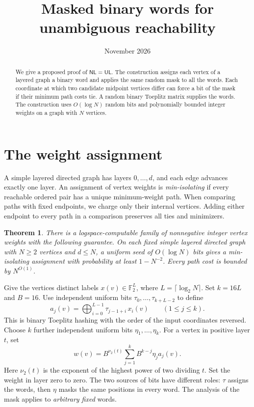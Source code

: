 \documentclass[11pt]{article}
\title{Masked binary words for unambiguous reachability}
\author{}
\date{November 2026}
\newtheorem{theorem}{Theorem}
\newcommand{\NL}{\mathsf{NL}}
\newcommand{\UL}{\mathsf{UL}}
\newcommand{\F}{\mathbb F}
\begin{document}
\maketitle
\begin{abstract}
We give a proposed proof of $\NL=\UL$. The construction assigns each
vertex of a layered graph a binary word and applies the same random mask
to all the words. Each coordinate at which two candidate midpoint
vertices differ can force a bit of the mask if their minimum path costs
tie. A random binary Toeplitz matrix supplies the words. The construction
uses $O(\log N)$ random bits and polynomially bounded integer weights on
a graph with $N$ vertices.
\end{abstract}

\section{The weight assignment}

A simple layered directed graph has layers $0,\ldots,d$, and each edge
advances exactly one layer. An assignment of vertex weights is
\emph{min-isolating} if every reachable ordered pair has a unique
minimum-weight path. When comparing paths with fixed endpoints, we charge
only their internal vertices. Adding either endpoint to every path in a
comparison preserves all ties and minimizers.

\begin{theorem}\label{thm:main}
There is a logspace-computable family of nonnegative integer vertex
weights with the following guarantee. On each fixed simple layered
directed graph with $N\ge2$ vertices and $d\le N$, a uniform seed of
$O(\log N)$ bits gives a min-isolating assignment with probability at
least $1-N^{-2}$. Every path cost is bounded by $N^{O(1)}$.
\end{theorem}

Give the vertices distinct labels $x(v)\in\F_2^L$, where
$L=\lceil\log_2 N\rceil$. Set $k=16L$ and $B=16$. Use independent
uniform bits $\tau_0,\ldots,\tau_{k+L-2}$ to define
\[
    a_j(v)=\bigoplus_{i=0}^{L-1}\tau_{j-1+i}\,x_i(v)
                       \qquad(1\le j\le k).
\]
This is binary Toeplitz hashing with the order of the input coordinates
reversed. Choose $k$ further independent uniform bits
$\eta_1,\ldots,\eta_k$. For a vertex in positive layer $t$, set
\begin{equation}\label{eq:weight}
    w(v)=B^{\nu_2(t)}\sum_{j=1}^k B^{k-j}\eta_j a_j(v).
\end{equation}
Here $\nu_2(t)$ is the exponent of the highest power of two dividing
$t$. Set the weight in layer zero to zero. The two sources of bits
have different roles: $\tau$ assigns the words, then $\eta$ masks
the same positions in every word. The analysis of the mask applies
to \emph{arbitrary fixed} words.
\end{document}
